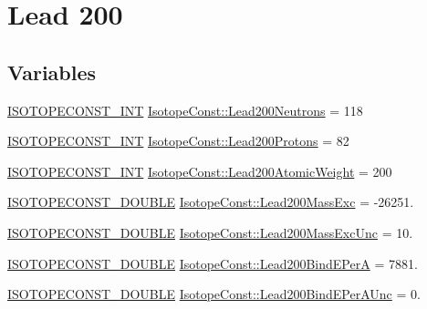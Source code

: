 \hypertarget{group___isotope_const-_lead-_pb200}{}\section{Lead 200}
\label{group___isotope_const-_lead-_pb200}
\subsection*{Variables}
\begin{DoxyCompactItemize}
\item 
\mbox{\hyperlink{group___isotope_const-_macros_ga5f18360b3e99483a35c32d789e62621c}{I\+S\+O\+T\+O\+P\+E\+C\+O\+N\+S\+T\+\_\+\+I\+NT}} \mbox{\hyperlink{group___isotope_const-_lead-_pb200_ga95102249d33e3f8701bb3df91eb9dc78}{Isotope\+Const\+::\+Lead200\+Neutrons}} = 118
\item 
\mbox{\hyperlink{group___isotope_const-_macros_ga5f18360b3e99483a35c32d789e62621c}{I\+S\+O\+T\+O\+P\+E\+C\+O\+N\+S\+T\+\_\+\+I\+NT}} \mbox{\hyperlink{group___isotope_const-_lead-_pb200_ga24808dd0f184cf84d37b9ae06f04b9c8}{Isotope\+Const\+::\+Lead200\+Protons}} = 82
\item 
\mbox{\hyperlink{group___isotope_const-_macros_ga5f18360b3e99483a35c32d789e62621c}{I\+S\+O\+T\+O\+P\+E\+C\+O\+N\+S\+T\+\_\+\+I\+NT}} \mbox{\hyperlink{group___isotope_const-_lead-_pb200_ga8130ea7c5a868230459034e1b02aaad9}{Isotope\+Const\+::\+Lead200\+Atomic\+Weight}} = 200
\item 
\mbox{\hyperlink{group___isotope_const-_macros_ga8f45a7272ce02c0b4c65c44636ed719a}{I\+S\+O\+T\+O\+P\+E\+C\+O\+N\+S\+T\+\_\+\+D\+O\+U\+B\+LE}} \mbox{\hyperlink{group___isotope_const-_lead-_pb200_ga8f81b22fd1dad5e8eaa29cdbbfc7b217}{Isotope\+Const\+::\+Lead200\+Mass\+Exc}} = -\/26251.
\item 
\mbox{\hyperlink{group___isotope_const-_macros_ga8f45a7272ce02c0b4c65c44636ed719a}{I\+S\+O\+T\+O\+P\+E\+C\+O\+N\+S\+T\+\_\+\+D\+O\+U\+B\+LE}} \mbox{\hyperlink{group___isotope_const-_lead-_pb200_ga83480ead5200af73ddaac493fe3dc3ac}{Isotope\+Const\+::\+Lead200\+Mass\+Exc\+Unc}} = 10.
\item 
\mbox{\hyperlink{group___isotope_const-_macros_ga8f45a7272ce02c0b4c65c44636ed719a}{I\+S\+O\+T\+O\+P\+E\+C\+O\+N\+S\+T\+\_\+\+D\+O\+U\+B\+LE}} \mbox{\hyperlink{group___isotope_const-_lead-_pb200_gad3b3271285c2b03abb208511d13da432}{Isotope\+Const\+::\+Lead200\+Bind\+E\+PerA}} = 7881.
\item 
\mbox{\hyperlink{group___isotope_const-_macros_ga8f45a7272ce02c0b4c65c44636ed719a}{I\+S\+O\+T\+O\+P\+E\+C\+O\+N\+S\+T\+\_\+\+D\+O\+U\+B\+LE}} \mbox{\hyperlink{group___isotope_const-_lead-_pb200_ga39078924f2ee4d45d225058b17cf4d8a}{Isotope\+Const\+::\+Lead200\+Bind\+E\+Per\+A\+Unc}} = 0.

\end{DoxyCompactItemize}
